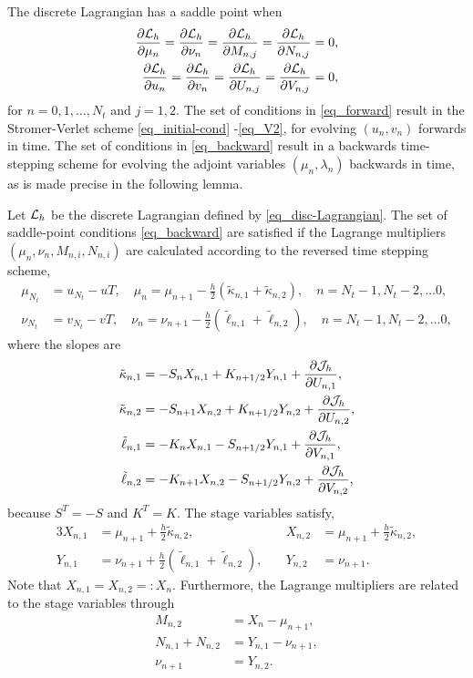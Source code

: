 \documentclass[11pt]{article}
\begin{document}
The discrete Lagrangian has a saddle point when
\begin{align}
  \frac{\partial{\cal L}_h}{\partial \mu_n} =
  \frac{\partial{\cal L}_h}{\partial \nu_n} =
  \frac{\partial{\cal L}_h}{\partial M_{n,j}} =
  \frac{\partial{\cal L}_h}{\partial N_{n,j}} &= 0,\label{eq_forward}\\
  \frac{\partial{\cal L}_h}{\partial u_n} =
  \frac{\partial{\cal L}_h}{\partial v_n} =
  \frac{\partial{\cal L}_h}{\partial U_{n,j}} =
  \frac{\partial{\cal L}_h}{\partial V_{n,j}} &= 0,\label{eq_backward}
\end{align}
for $n=0,1,\ldots,N_t$ and $j=1,2$. The set of conditions in \eqref{eq_forward} result in the
Stromer-Verlet scheme \eqref{eq_initial-cond} -\eqref{eq_V2}, for evolving $(u_n, v_n)$ forwards in
time. The set of conditions in \eqref{eq_backward} result in a backwards time-stepping scheme
for evolving the adjoint variables $(\mu_n, \lambda_n)$ backwards in time, as is made precise in the
following lemma.
%
\begin{lemma} Let ${\cal L}_h$ be the discrete Lagrangian defined by \eqref{eq_disc-Lagrangian}. The set of
  saddle-point conditions \eqref{eq_backward} are satisfied if the Lagrange multipliers $(\mu_n,
  \nu_n, M_{n,i}, N_{n,i})$ are calculated according to the reversed time stepping scheme,
\begin{align}
  \mu_{N_t} &= u_{N_t} - uT,\quad \mu_n = \mu_{n+1} - \frac{h}{2} \left(\tilde\kappa_{n,1} +
  \tilde\kappa_{n,2}\right),\quad n=N_t -1, N_t - 2, \ldots 0,\label{eq_mu}\\
  \nu_{N_t} &= v_{N_t} - vT,\quad \nu_{n} = \nu_{n+1} - \frac{h}{2} \left( \tilde\ell_{n,1} + \tilde\ell_{n,2} \right),\quad n=N_t -1, N_t -2, \ldots 0,
\end{align}
where the slopes are
\begin{align}
\tilde\kappa_{n,1} &= -S_n X_{n,1} + K_{n+1/2} Y_{n,1} + \frac{\partial {\cal J}_h}{\partial U_{n,1}} ,\\
\tilde\kappa_{n,2} &= -S_{n+1} X_{n,2} + K_{n+1/2} Y_{n,2}  + \frac{\partial {\cal J}_h}{\partial U_{n,2}},\\
\tilde\ell_{n,1} &= -K_{n} X_{n,1} - S_{n+1/2} Y_{n,1}  + \frac{\partial {\cal J}_h}{\partial V_{n,1}},\\
\tilde\ell_{n,2} &= -K_{n+1} X_{n,2} - S_{n+1/2} Y_{n,2}  + \frac{\partial {\cal J}_h}{\partial V_{n,2}},
\end{align}
because $S^T = -S$ and $K^T = K$. The stage variables satisfy,
\begin{alignat}{3}
  X_{n,1} &= \mu_{n+1} + \frac{h}{2} \tilde\kappa_{n,2},\quad
  &X_{n,2} & = \mu_{n+1} + \frac{h}{2} \tilde\kappa_{n,2},\\
  Y_{n,1} &= \nu_{n+1} +\frac{h}{2} \left( \tilde\ell_{n,1} + \tilde\ell_{n,2} \right),\quad
  &Y_{n,2} &= \nu_{n+1}.\label{eq_Y2}
\end{alignat}
Note that $X_{n,1}=X_{n,2} =: X_n$. Furthermore, the Lagrange multipliers are related to the stage variables through
\begin{align}
  M_{n,2} &= X_{n} - \mu_{n+1},\label{eq_MX}\\
  N_{n,1} + N_{n,2} &= Y_{n,1} - \nu_{n+1},\label{eq_NY1}\\
  \nu_{n+1} &= Y_{n,2}.\label{eq_NY2}
\end{align}
\end{lemma}
\end{document}
